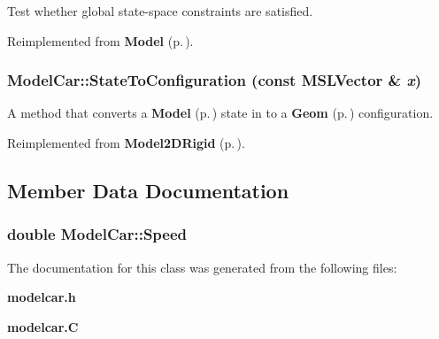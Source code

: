 Test whether global state-space constraints are satisfied.



Reimplemented from {\bf Model} {\rm (p.\,\pageref{classModel_a4})}.
\subsubsection{ Model\-Car::State\-To\-Configuration (const {\bf MSLVector} \& {\em x})\hspace{0.3cm}{\tt  [virtual]}}\label{classModelCar_a2}


A method that converts a {\bf Model} {\rm (p.\,\pageref{classModel})} state in to a {\bf Geom} {\rm (p.\,\pageref{classGeom})} configuration.



Reimplemented from {\bf Model2DRigid} {\rm (p.\,\pageref{classModel2DRigid_a6})}.

\subsection{Member Data Documentation}
\subsubsection{\setlength{\rightskip}{0pt plus 5cm}double Model\-Car::Speed}\label{classModelCar_m0}




The documentation for this class was generated from the following files:\begin{CompactItemize}
\item 
{\bf modelcar.h}\item 
{\bf modelcar.C}\end{CompactItemize}
